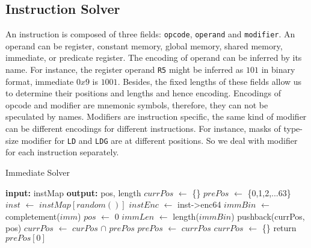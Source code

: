 \subsection{Instruction Solver}
An instruction is composed of three fields: {\tt opcode}, {\tt operand} and {\tt modifier}. An operand can be register, constant memory, global memory, shared memory, immediate, or predicate register.
The encoding of operand can be inferred by its name. For instance, the register operand {\tt R5} might be
inferred as $101$ in binary format, immediate $0x9$ is $1001$. Besides, the fixed lengths of these fields allow us to determine their positions and lengths and hence encoding. Encodings of opcode and modifier are mnemonic symbols, therefore, they can not be speculated by names. Modifiers are instruction specific, the same kind of modifier can be different encodings for different instructions. For instance, masks of type-size
modifier for {\tt LD} and {\tt LDG} are at different positions. So we deal with modifier for each instruction separately. 


\begin{algorithm}
      \caption{Immediate Solver}
      \label{algo:int_solver}
  \begin{algorithmic}[1]
	  \State \textbf{input:} instMap
      \State \textbf{output:} pos, length
      \State $currPos$ $\gets$ \{\}
      \State $prePos$ $\gets$ \{0,1,2,...63\}
      \State $inst$ $\gets$ $instMap[random()]$
      \State $instEnc$ $\gets$ inst->enc64
      \State $immBin$ $\gets$ completement($imm$)
      \State $pos$ $\gets$ 0
      \State $immLen$ $\gets$ length($immBin$)
      \State pushback(currPos, pos)
      \EndIf
      \EndWhile
      \State $currPos$ $\gets$ $curPos$ $\cap$ $prePos$
      \State $prePos$ $\gets$ $currPos$
      \State $currPos$ $\gets$ \{\}
      \EndIf
      \EndWhile
      \State return $prePos[0]$
  \end{algorithmic}
\end{algorithm}

